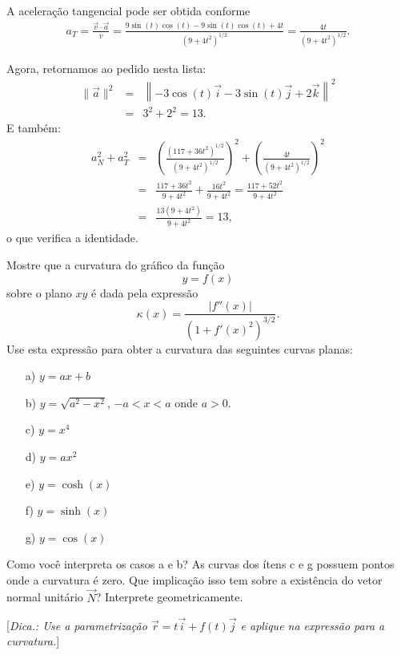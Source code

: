 \begin{resol}
A aceleração tangencial pode ser obtida conforme
\begin{eqnarray*}a_T=\frac{\vec{v}\cdot \vec{a}}{v}=\frac{9\sin(t)\cos(t) -9\sin(t) \cos(t)+4t}{\left(9+4t^2\right)^{1/2}}=\frac{4t}{\left(9+4t^2\right)^{1/2}}.
\end{eqnarray*}

Agora, retornamos ao pedido nesta lista:
\begin{eqnarray*}
 \|\vec{a}\|^2&=&\left\|-3\cos (t) \vec{i} - 3\sin (t) \vec{j} +2\vec{k}\right\|^2\\&=&3^2+2^2=13.
\end{eqnarray*}
E também:
\begin{eqnarray*}
a_N^2+a_T^2&=&\left(\frac{\left(117+36t^2\right)^{1/2}}{\left(9+4t^2\right)^{1/2}}\right)^2+\left(\frac{4t}{\left(9+4t^2\right)^{1/2}}\right)^2\\
&=&\frac{117+36t^2}{9+4t^2}+\frac{16t^2}{9+4t^2}=\frac{117+52t^2}{9+4t^2}\\&=&
\frac{13(9+4t^2)}{9+4t^2}=13,
\end{eqnarray*}
o que verifica a identidade.
 
\end{resol}



\begin{exeresol}
Mostre que a curvatura do gráfico da função
$$y=f(x)$$
sobre o plano $xy$
é dada pela expressão
$$\kappa(x)=\frac{|f''(x)|}{\left(1+f'(x)^2\right)^{3/2}}.$$
Use esta expressão para obter a curvatura das seguintes curvas planas:
\begin{itemize}
\item[a)] $y=ax+b$
\item[b)]$y=\sqrt{a^2-x^2}$, $-a<x<a$ onde $a>0$.
\item[c)] $y=x^4$
\item[d)] $y=ax^2$ 
\item[e)] $y=\cosh(x)$
\item[f)] $y=\sinh(x)$
\item[g)] $y=\cos(x)$
\end{itemize}
Como você interpreta os casos a e b? As curvas dos ítens c e g possuem pontos onde a curvatura é zero. Que implicação isso tem sobre a existência do vetor normal unitário $\vec{N}$? Interprete geometricamente.


[{\it Dica.: Use a parametrização $\vec{r}=t\vec{i}+f(t)\vec{j}$ e aplique na expressão para a curvatura.}]
\end{exeresol}


